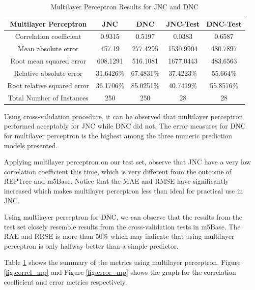 \begin{table}[h]
\centering
\caption{Multilayer Perceptron Results for JNC and DNC}
\label{table:mp_results}
\begin{tabular}{|c|c|c|c|c|}
\hline 
Multilayer Perceptron & JNC & DNC & JNC-Test & DNC-Test \\ 
\hline 
Correlation coefficient & 0.9315 & 0.5197 & 0.0383 & 0.6587
\\Mean absolute error & 457.19 & 277.4295 & 1530.9904 & 480.7897
\\Root mean squared error & 608.1291 &  516.1081 & 1677.0443 & 483.6563
\\Relative absolute error &31.6426\% & 67.4831\% & 37.4223\% & 55.664\%
\\Root relative squared error  & 36.1706\% & 85.0251\% & 40.7419\% & 55.8576\% 
\\Total Number of Instances & 250 & 250 & 28 & 28
\\
\hline 
\end{tabular}
\end{table}

Using cross-validation procedure, it can be observed that multilayer perceptron performed acceptably for JNC while DNC did not. The error measures for DNC for multilayer perceptron is the highest among the three numeric prediction models presented.

Applying multilayer perceptron on our test set, observe that JNC have a very low correlation coefficient this time, which is very different from the outcome of REPTree and m5Base. Notice that the MAE and RMSE have significantly increased which makes multilayer perceptron less than ideal for practical use in JNC.

Using multilayer perceptron for DNC, we can observe that the results from the test set closely resemble results from the cross-validation tests in m5Base. The RAE and RRSE is more than 50\% which may indicate that using multilayer perceptron is only halfway better than a simple predictor. 

Table \ref{table:mp_results} shows the summary of the metrics using multilayer perceptron. Figure \ref{fig:correl_mp} and Figure \ref{fig:error_mp} shows the graph for the correlation coefficient and error metrics respectively.

